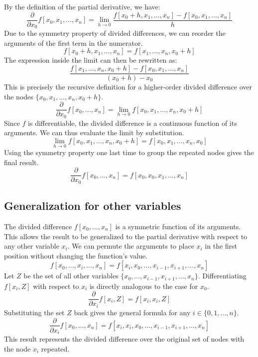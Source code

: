 \documentclass[a4paper]{article}
\begin{document}
By the definition of the partial derivative, we have:
\[
\frac{\partial}{\partial x_0} f[x_0, x_1, \dots, x_n] = \lim_{h \to 0} \frac{f[x_0+h, x_1, \dots, x_n] - f[x_0, x_1, \dots, x_n]}{h}
\]
Due to the symmetry property of divided differences, we can reorder the arguments of the first term in the numerator.
\[
f[x_0+h, x_1, \dots, x_n] = f[x_1, \dots, x_n, x_0+h]
\]
The expression inside the limit can then be rewritten as:
\[
\frac{f[x_1, \dots, x_n, x_0+h] - f[x_0, x_1, \dots, x_n]}{(x_0+h) - x_0}
\]
This is precisely the recursive definition for a higher-order divided difference over the nodes $\{x_0, x_1, \dots, x_n, x_0+h\}$.
\[
\frac{\partial}{\partial x_0} f[x_0, \dots, x_n] = \lim_{h \to 0} f[x_0, x_1, \dots, x_n, x_0+h]
\]
Since $f$ is differentiable, the divided difference is a continuous function of its arguments. We can thus evaluate the limit by substitution.
\[
\lim_{h \to 0} f[x_0, x_1, \dots, x_n, x_0+h] = f[x_0, x_1, \dots, x_n, x_0]
\]
Using the symmetry property one last time to group the repeated nodes gives the final result.
\[
\frac{\partial}{\partial x_0} f[x_0, \dots, x_n] = f[x_0, x_0, x_1, \dots, x_n]
\]

\subsection*{Generalization for other variables}

The divided difference $f[x_0, \dots, x_n]$ is a symmetric function of its arguments. This allows the result to be generalized to the partial derivative with respect to any other variable $x_i$.
We can permute the arguments to place $x_i$ in the first position without changing the function's value.
\[
f[x_0, \dots, x_i, \dots, x_n] = f[x_i, x_0, \dots, x_{i-1}, x_{i+1}, \dots, x_n]
\]
Let $Z$ be the set of all other variables $\{x_0, \dots, x_{i-1}, x_{i+1}, \dots, x_n\}$. Differentiating $f[x_i, Z]$ with respect to $x_i$ is directly analogous to the case for $x_0$.
\[
\frac{\partial}{\partial x_i} f[x_i, Z] = f[x_i, x_i, Z]
\]
Substituting the set $Z$ back gives the general formula for any $i \in \{0, 1, \dots, n\}$.
\[
\frac{\partial}{\partial x_i} f[x_0, \dots, x_n] = f[x_i, x_i, x_0, \dots, x_{i-1}, x_{i+1}, \dots, x_n]
\]
This result represents the divided difference over the original set of nodes with the node $x_i$ repeated.
\end{document}
